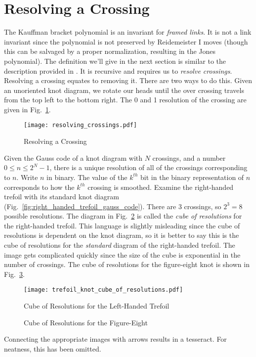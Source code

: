 \documentclass{article}
\theoremstyle{plain}
\begin{document}
    \section{Resolving a Crossing}
        The Kauffman bracket polynomial is an invariant for
        \textit{framed links}. It is not a link invariant since the polynomial
        is not preserved by Reidemeister I moves (though this can be salvaged
        by a proper normalization, resulting in the Jones polynomial). The
        definition we'll give in the next section is similar to the
        description provided in \cite{barnatan2002khovanov}. It is recursive
        and requires us to \textit{resolve crossings}. Resolving a crossing
        equates to removing it. There are two ways to do this.
        Given an unoriented knot diagram, we rotate our heads until
        the over crossing travels from the top left to the bottom right. The
        0 and 1 resolution of the crossing are given in
        Fig.~\ref{fig:resolving_crossing}.
        \begin{figure}
            \centering
            \texttt{[image: resolving\_crossings.pdf]}
            \caption{Resolving a Crossing}
            \label{fig:resolving_crossing}
        \end{figure}
        Given the Gauss code of a knot diagram with $N$ crossings, and a number
        $0\leq{n}\leq{2}^{N}-1$, there is a unique resolution of all of the
        crossings corresponding to $n$. Write $n$ in binary. The value of the
        $k^{th}$ bit in the binary representation of $n$ corresponds to how the
        $k^{th}$ crossing is smoothed. Examine the right-handed trefoil with its
        standard knot diagram (Fig.~\ref{fig:right_handed_trefoil_gauss_code}).
        There are 3 crossings, so $2^{3}=8$ possible resolutions. The diagram
        in Fig.~\ref{fig:trefoil_knot_cube_of_resolutions} is called the
        \textit{cube of resolutions} for the right-handed
        trefoil. This language is slightly misleading since the cube of
        resolutions is dependent on the knot diagram, so it is better to say
        this is the cube of resolutions for the \textit{standard} diagram of
        the right-handed trefoil. The image gets complicated quickly since the
        size of the cube is exponential in the number of crossings. The cube of
        resolutions for the figure-eight knot is shown in
        Fig.~\ref{fig:figure_eight_knot_cube_of_resolutions}.
        \begin{figure}
            \centering
            \texttt{[image: trefoil\_knot\_cube\_of\_resolutions.pdf]}
            \caption{Cube of Resolutions for the Left-Handed Trefoil}
            \label{fig:trefoil_knot_cube_of_resolutions}
        \end{figure}
        \begin{figure}
            \centering
            \caption{Cube of Resolutions for the Figure-Eight}
            \label{fig:figure_eight_knot_cube_of_resolutions}
        \end{figure}
        Connecting the appropriate images with arrows results in a tesseract.
        For neatness, this has been omitted.
\end{document}
